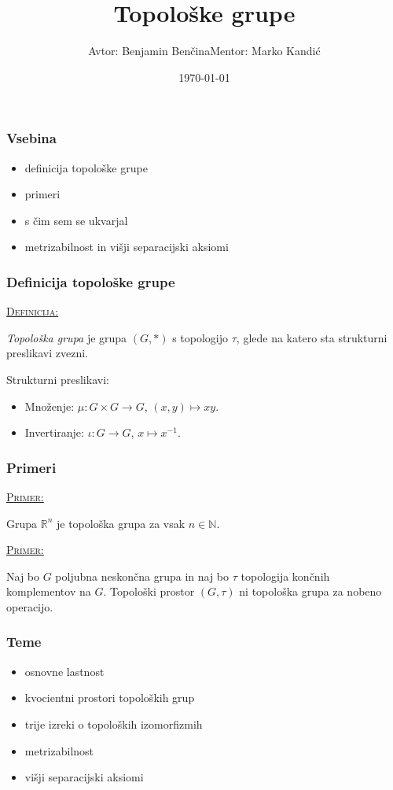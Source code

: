 \documentclass[a4paper, 12pt]{beamer}
\title{Topološke grupe}
\author[Benjamin Benčina]{Avtor: Benjamin Benčina\newline \newline \footnotesize Mentor: Marko Kandić}
\institute[FMF]{Fakulteta za matematiko in fiziko}
\date{\today}
\newenvironment{matematika}[1]{
\textcolor{bostonuniversityred}{\underline{\textsc{#1:}}}
}{
}
\begin{document}
	
\titlepage

\begin{frame}
\frametitle{Vsebina}
\begin{itemize}[label = ]
	\item definicija topološke grupe
	\item primeri
	\item s čim sem se ukvarjal
	\item metrizabilnost in višji separacijski aksiomi
\end{itemize}
\end{frame}

\begin{frame}
\frametitle{Definicija topološke grupe}
\begin{matematika}{Definicija}
	\emph{Topološka grupa} je grupa $(G, *)$ s topologijo $\tau$, glede na katero sta strukturni preslikavi zvezni.
\end{matematika}
\newline
\newline
Strukturni preslikavi:
\begin{itemize}[label=]
	\item Množenje: $\mu : G \times G \to G$, $(x, y) \mapsto xy$.
	\item Invertiranje: $\iota : G \to G$, $x \mapsto x^{-1}$.
\end{itemize}
\end{frame}

\begin{frame}
\frametitle{Primeri}
\begin{matematika}{Primer}
Grupa $\mathbb{R}^n$ je topološka grupa za vsak $n \in \mathbb{N}$.\newline\newline
\end{matematika}
\begin{matematika}{Primer}
Naj bo $G$ poljubna neskončna grupa in naj bo $\tau$ topologija končnih komplementov na $G$. Topološki prostor $(G, \tau)$ ni topološka grupa za nobeno operacijo.
\end{matematika}
\end{frame}

\begin{frame}
\frametitle{Teme}
\begin{itemize}[label = ]
	\item osnovne lastnost
	\item kvocientni prostori topoloških grup
	\item trije izreki o topoloških izomorfizmih
	\item metrizabilnost
	\item višji separacijski aksiomi
\end{itemize}
\end{frame}
\end{document}
